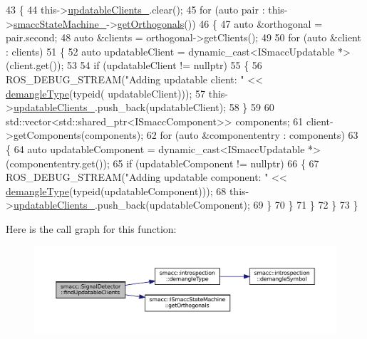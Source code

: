 \begin{DoxyCode}
43 \{
44     this->\hyperlink{classsmacc_1_1SignalDetector_a01a457b4ec935473d6426efb7b87e683}{updatableClients\_}.clear();
45     \textcolor{keywordflow}{for} (\textcolor{keyword}{auto} pair : this->\hyperlink{classsmacc_1_1SignalDetector_a46025de6ac7b5980e22144f9703236a4}{smaccStateMachine\_}->\hyperlink{classsmacc_1_1ISmaccStateMachine_a7f5b2882dbd077584767cb2533ed3c49}{getOrthogonals}())
46     \{
47         \textcolor{keyword}{auto} &orthogonal = pair.second;
48         \textcolor{keyword}{auto} &clients = orthogonal->getClients();
49 
50         \textcolor{keywordflow}{for} (\textcolor{keyword}{auto} &client : clients)
51         \{
52             \textcolor{keyword}{auto} updatableClient = \textcolor{keyword}{dynamic\_cast<}ISmaccUpdatable *\textcolor{keyword}{>}(client.get());
53 
54             \textcolor{keywordflow}{if} (updatableClient != \textcolor{keyword}{nullptr})
55             \{
56                 ROS\_DEBUG\_STREAM(\textcolor{stringliteral}{"Adding updatable client: "} << \hyperlink{namespacesmacc_1_1introspection_a670e39ccea29952859df4e2d0e45077b}{demangleType}(\textcolor{keyword}{typeid}(
      updatableClient)));
57                 this->\hyperlink{classsmacc_1_1SignalDetector_a01a457b4ec935473d6426efb7b87e683}{updatableClients\_}.push\_back(updatableClient);
58             \}
59 
60             std::vector<std::shared\_ptr<ISmaccComponent>> components;
61             client->getComponents(components);
62             \textcolor{keywordflow}{for} (\textcolor{keyword}{auto} &componententry : components)
63             \{
64                 \textcolor{keyword}{auto} updatableComponent = \textcolor{keyword}{dynamic\_cast<}ISmaccUpdatable *\textcolor{keyword}{>}(componententry.get());
65                 \textcolor{keywordflow}{if} (updatableComponent != \textcolor{keyword}{nullptr})
66                 \{
67                     ROS\_DEBUG\_STREAM(\textcolor{stringliteral}{"Adding updatable component: "} << 
      \hyperlink{namespacesmacc_1_1introspection_a670e39ccea29952859df4e2d0e45077b}{demangleType}(\textcolor{keyword}{typeid}(updatableComponent)));
68                     this->\hyperlink{classsmacc_1_1SignalDetector_a01a457b4ec935473d6426efb7b87e683}{updatableClients\_}.push\_back(updatableComponent);
69                 \}
70             \}
71         \}
72     \}
73 \}
\end{DoxyCode}
Here is the call graph for this function\+:
\nopagebreak
\begin{figure}[H]
\begin{center}
\leavevmode
\includegraphics[width=350pt]{classsmacc_1_1SignalDetector_a47ec2df560e2e33758ce3975bece9385_cgraph}
\end{center}
\end{figure}
